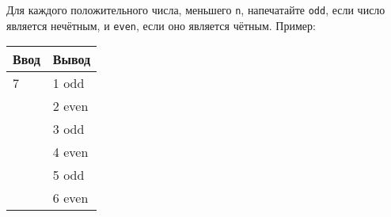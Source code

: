 Для каждого положительного числа, меньшего \texttt{n}, напечатайте
\texttt{odd}, если число является нечётным, и \texttt{even}, если оно
является чётным. Пример:

\begin{longtable}[c]{@{}ll@{}}
\toprule
\begin{minipage}[b]{0.09\columnwidth}\raggedright\strut
Ввод
\strut\end{minipage} &
\begin{minipage}[b]{0.12\columnwidth}\raggedright\strut
Вывод
\strut\end{minipage}\tabularnewline
\midrule
\endhead
\begin{minipage}[t]{0.09\columnwidth}\raggedright\strut
7
\strut\end{minipage} &
\begin{minipage}[t]{0.12\columnwidth}\raggedright\strut
1 odd
\strut\end{minipage}\tabularnewline
\begin{minipage}[t]{0.09\columnwidth}\raggedright\strut
\strut\end{minipage} &
\begin{minipage}[t]{0.12\columnwidth}\raggedright\strut
2 even
\strut\end{minipage}\tabularnewline
\begin{minipage}[t]{0.09\columnwidth}\raggedright\strut
\strut\end{minipage} &
\begin{minipage}[t]{0.12\columnwidth}\raggedright\strut
3 odd
\strut\end{minipage}\tabularnewline
\begin{minipage}[t]{0.09\columnwidth}\raggedright\strut
\strut\end{minipage} &
\begin{minipage}[t]{0.12\columnwidth}\raggedright\strut
4 even
\strut\end{minipage}\tabularnewline
\begin{minipage}[t]{0.09\columnwidth}\raggedright\strut
\strut\end{minipage} &
\begin{minipage}[t]{0.12\columnwidth}\raggedright\strut
5 odd
\strut\end{minipage}\tabularnewline
\begin{minipage}[t]{0.09\columnwidth}\raggedright\strut
\strut\end{minipage} &
\begin{minipage}[t]{0.12\columnwidth}\raggedright\strut
6 even
\strut\end{minipage}\tabularnewline
\bottomrule
\end{longtable}

